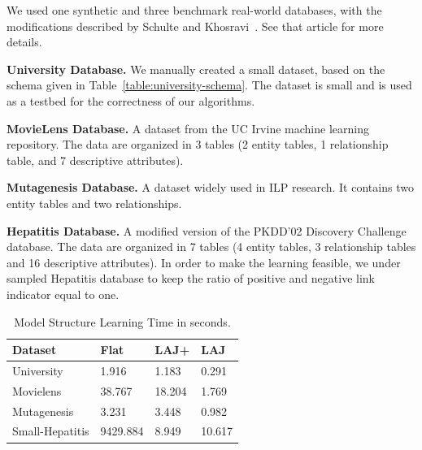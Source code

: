 \documentclass{article}
\begin{document}
We used one synthetic and 
three benchmark real-world databases, with the modifications described by Schulte and Khosravi~\cite{Schulte2012}. See that article for more
details.

\noindent\textbf{University Database.} We manually created a small dataset, based on the schema given in Table~\ref{table:university-schema}. 
The dataset is small and is used as a testbed for the correctness of our algorithms.

\noindent\textbf{MovieLens Database.} A dataset from the UC Irvine machine learning repository. The data are organized in 3 tables (2 entity tables, 1 relationship table, and 7 descriptive attributes). 

\noindent\textbf{Mutagenesis Database.} A dataset widely used in ILP research. %
It contains two entity tables and two relationships.

\noindent\textbf{Hepatitis Database.} A modified version of the PKDD'02 Discovery Challenge database. The data are organized in 7 tables (4 entity tables, 3 relationship tables and 16 descriptive attributes). In order to make the learning feasible, we under sampled Hepatitis database to keep the ratio of positive and negative link indicator equal to one. %




\begin{table} \centering
\begin{tabular}[c]
{|l|l|l|l|}\hline
 \textbf{Dataset} & \textbf{Flat} & \textbf{LAJ+} & \textbf{LAJ}\\\hline
University&1.916&1.183&0.291 \\\hline
Movielens &38.767& 18.204& 1.769\\\hline
Mutagenesis &3.231& 3.448& 0.982\\\hline
Small-Hepatitis &9429.884&8.949&10.617 \\\hline
\end{tabular}
\caption{Model Structure Learning Time  in seconds.
 \label{table:runtimes}}
\end{table}
\end{document}
